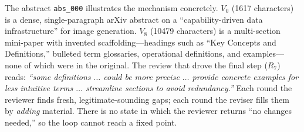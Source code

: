 The abstract \texttt{abs\_000} illustrates the mechanism concretely. $V_0$ (1617 characters)
is a dense, single-paragraph arXiv abstract on a ``capability-driven data infrastructure'' for
image generation. $V_8$ (10479 characters) is a multi-section mini-paper with invented
scaffolding---headings such as ``Key Concepts and Definitions,'' bulleted term glossaries,
operational definitions, and examples---none of which were in the original. The review that
drove the final step ($R_7$) reads: \emph{``some definitions $\dots$ could be more precise
$\dots$ provide concrete examples for less intuitive terms $\dots$ streamline sections to
avoid redundancy.''} Each round the reviewer finds fresh, legitimate-sounding gaps; each round
the reviser fills them by \emph{adding} material. There is no state in which the reviewer
returns ``no changes needed,'' so the loop cannot reach a fixed point.
